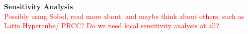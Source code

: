\documentclass[12pt]{article}
\begin{document}

\textbf{Sensitivity Analysis} \\ 

\textcolor{red}{Possibly using Sobol, read more about, and maybe think about others, such as Latin Hypercube/ PRCC? Do we need local sensitivity analysis at all?} 
\end{document}
